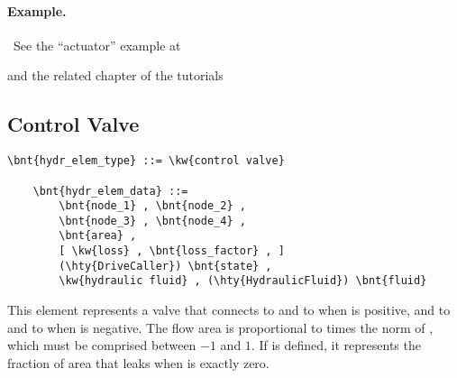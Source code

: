 \paragraph{Example.} \
See the ``actuator'' example at
\begin{quote}
\end{quote}
and the related chapter of the tutorials
\begin{quote}
\end{quote}




\subsection{Control Valve}
\label{sec:EL:HYDR:CONTROL_VALVE}
\begin{Verbatim}[commandchars=\\\{\}]
    \bnt{hydr_elem_type} ::= \kw{control valve}

    \bnt{hydr_elem_data} ::=
        \bnt{node_1} , \bnt{node_2} ,
        \bnt{node_3} , \bnt{node_4} ,
        \bnt{area} ,
        [ \kw{loss} , \bnt{loss_factor} , ]
        (\hty{DriveCaller}) \bnt{state} ,
        \kw{hydraulic fluid} , (\hty{HydraulicFluid}) \bnt{fluid}
\end{Verbatim}
This element represents a valve that connects
 to  and  to 
when  is positive, and \nt{node\_1} to \nt{node\_3}
and \nt{node\_2} to \nt{node\_4} when \nt{state} is negative.
The flow area is proportional to  times the norm of ,
which must be comprised between $-1$ and $1$.
If  is defined, it represents the fraction
of area that leaks when  is exactly zero.



